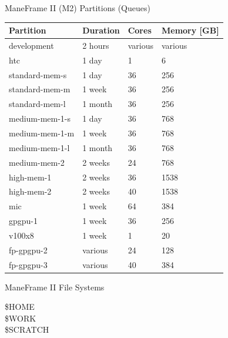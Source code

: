 \begin{frame}{ManeFrame II (M2) Partitions (Queues)}
\begin{table}
\tiny
\begin{tabular}{llll}
\toprule
Partition & Duration & Cores & Memory [GB]\\
\midrule
development & 2 hours & various & various\\
htc & 1 day & 1 & 6\\
standard-mem-s & 1 day & 36 & 256\\
standard-mem-m & 1 week & 36 & 256\\
standard-mem-l & 1 month & 36 & 256\\
medium-mem-1-s & 1 day & 36 & 768\\
medium-mem-1-m & 1 week & 36 & 768\\
medium-mem-1-l & 1 month & 36 & 768\\
medium-mem-2 & 2 weeks & 24 & 768\\
high-mem-1 & 2 weeks & 36 & 1538\\
high-mem-2 & 2 weeks & 40 & 1538\\
mic & 1 week & 64 & 384\\
gpgpu-1 & 1 week & 36 & 256\\
v100x8 & 1 week & 1 & 20\\
fp-gpgpu-2 & various & 24 & 128\\
fp-gpgpu-3 & various & 40 & 384\\
\bottomrule
\end{tabular}
\end{table}
\end{frame}

\begin{frame}{ManeFrame II File Systems}
\begin{description}
\item[\$HOME]
\item[\$WORK]
\item[\$SCRATCH]
\end{description}
\end{frame}

